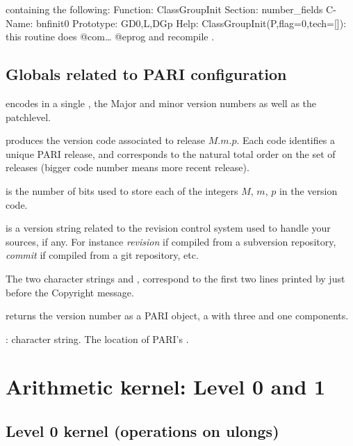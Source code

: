 
\noindent containing the following:
\bprog
Function: ClassGroupInit
Section: number_fields
C-Name: bnfinit0
Prototype: GD0,L,DGp
Help: ClassGroupInit(P,{flag=0},{tech=[]}): this routine does @com\dots
@eprog\noindent
and recompile .

\section{Globals related to PARI configuration}

\noindent {} encodes in a single , the Major
and minor version numbers as well as the patchlevel.

 produces the version code
associated to release $M.m.p$. Each code identifies a unique PARI release,
and corresponds to the natural total order on the set of releases (bigger
code number means more recent release).

\noindent {} is the number of bits used to store each of
the integers $M$, $m$, $p$ in the version code.

\noindent {} is a version string related to the
revision control system used to handle your sources, if any. For instance
\emph{revision} if compiled from a subversion repository,
\emph{commit} if compiled from a git repository, etc.

The two character strings  and ,
correspond to the first two lines printed by  just before the
Copyright message.

 returns the version number as a PARI object, a
 with three  and one  components.


: character string. The location of PARI's .

\newpage
\chapter{Arithmetic kernel: Level 0 and 1}

\section{Level 0 kernel (operations on ulongs)}

